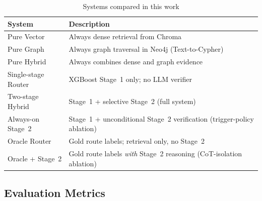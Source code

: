 \begin{table}[!htbp]
\centering
\caption{Systems compared in this work}\label{tab:systems}
\begin{tabularx}{\columnwidth}{L{2.7cm}Y}
\toprule
\textbf{System} & \textbf{Description} \\
\midrule
Pure Vector & Always dense retrieval from Chroma \\
Pure Graph & Always graph traversal in Neo4j (Text-to-Cypher) \\
Pure Hybrid & Always combines dense and graph evidence \\
Single-stage Router & XGBoost Stage~1 only; no LLM verifier \\
Two-stage Hybrid & Stage~1 + selective Stage~2 (full system) \\
Always-on Stage~2 & Stage~1 + unconditional Stage~2 verification (trigger-policy ablation) \\
Oracle Router & Gold route labels; retrieval only, no Stage~2 \\
Oracle + Stage~2 & Gold route labels \emph{with} Stage~2 reasoning (CoT-isolation ablation) \\
\bottomrule
\end{tabularx}
\end{table}

\subsection{Evaluation Metrics}\label{subsec:metrics}

